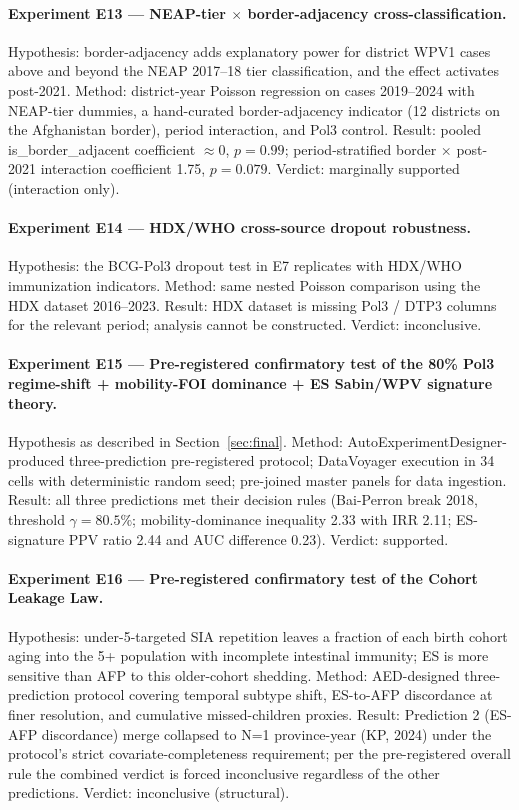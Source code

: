 \documentclass[11pt]{article}
\begin{document}
\paragraph{Experiment E13 --- NEAP-tier $\times$ border-adjacency cross-classification.} Hypothesis: border-adjacency adds explanatory power for district WPV1 cases above and beyond the NEAP 2017--18 tier classification, and the effect activates post-2021. Method: district-year Poisson regression on cases 2019--2024 with NEAP-tier dummies, a hand-curated border-adjacency indicator (12 districts on the Afghanistan border), period interaction, and Pol3 control. Result: pooled is\_border\_adjacent coefficient $\approx 0$, $p{=}0.99$; period-stratified border $\times$ post-2021 interaction coefficient 1.75, $p{=}0.079$. Verdict: marginally supported (interaction only).

\paragraph{Experiment E14 --- HDX/WHO cross-source dropout robustness.} Hypothesis: the BCG-Pol3 dropout test in E7 replicates with HDX/WHO immunization indicators. Method: same nested Poisson comparison using the HDX dataset 2016--2023. Result: HDX dataset is missing Pol3 / DTP3 columns for the relevant period; analysis cannot be constructed. Verdict: inconclusive.

\paragraph{Experiment E15 --- Pre-registered confirmatory test of the 80\% Pol3 regime-shift + mobility-FOI dominance + ES Sabin/WPV signature theory.} Hypothesis as described in Section~\ref{sec:final}. Method: AutoExperimentDesigner-produced three-prediction pre-registered protocol; DataVoyager execution in 34 cells with deterministic random seed; pre-joined master panels for data ingestion. Result: all three predictions met their decision rules (Bai-Perron break 2018, threshold $\gamma{=}80.5\%$; mobility-dominance inequality 2.33 with IRR 2.11; ES-signature PPV ratio 2.44 and AUC difference 0.23). Verdict: supported.

\paragraph{Experiment E16 --- Pre-registered confirmatory test of the Cohort Leakage Law.} Hypothesis: under-5-targeted SIA repetition leaves a fraction of each birth cohort aging into the 5+ population with incomplete intestinal immunity; ES is more sensitive than AFP to this older-cohort shedding. Method: AED-designed three-prediction protocol covering temporal subtype shift, ES-to-AFP discordance at finer resolution, and cumulative missed-children proxies. Result: Prediction 2 (ES-AFP discordance) merge collapsed to N=1 province-year (KP, 2024) under the protocol's strict covariate-completeness requirement; per the pre-registered overall rule the combined verdict is forced inconclusive regardless of the other predictions. Verdict: inconclusive (structural).
\end{document}
